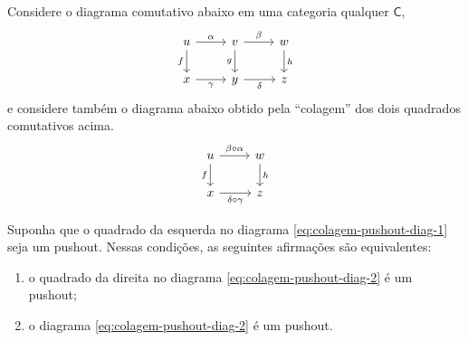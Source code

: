  \begin{teo}
   Considere o diagrama comutativo abaixo em uma categoria qualquer $\mathsf{C}$,
   \begin{equation}\label{eq:colagem-pushout-diag-1}
     \begin{tikzcd}
       u
       \arrow[r, "\alpha"]
       \arrow[d, "f" swap]
       & v
       \arrow[r, "\beta"]
       \arrow[d, "g" swap]
       & w
       \arrow[d, "h"]
       \\ x
       \arrow[r, "\gamma" swap]
       & y
       \arrow[r, "\delta" swap]
       & z
     \end{tikzcd}
   \end{equation}
   e considere também o diagrama abaixo obtido pela ``colagem'' dos dois quadrados comutativos acima.
   \begin{equation}\label{eq:colagem-pushout-diag-2}
     \begin{tikzcd}
       u
       \arrow[r, "\beta \circ \alpha"]
       \arrow[d, "f" swap]
       & w
       \arrow[d, "h"]
       \\ x
       \arrow[r, "\delta \circ \gamma" swap]
       & z
     \end{tikzcd}
   \end{equation}

  Suponha que o quadrado da esquerda no diagrama \eqref{eq:colagem-pushout-diag-1} seja um pushout. Nessas condições, as seguintes afirmações são equivalentes:
   \begin{enumerate}
   \item o quadrado da direita no diagrama \eqref{eq:colagem-pushout-diag-2} é um pushout;
   \item o diagrama \eqref{eq:colagem-pushout-diag-2} é um pushout.
   \end{enumerate}
 \end{teo}

